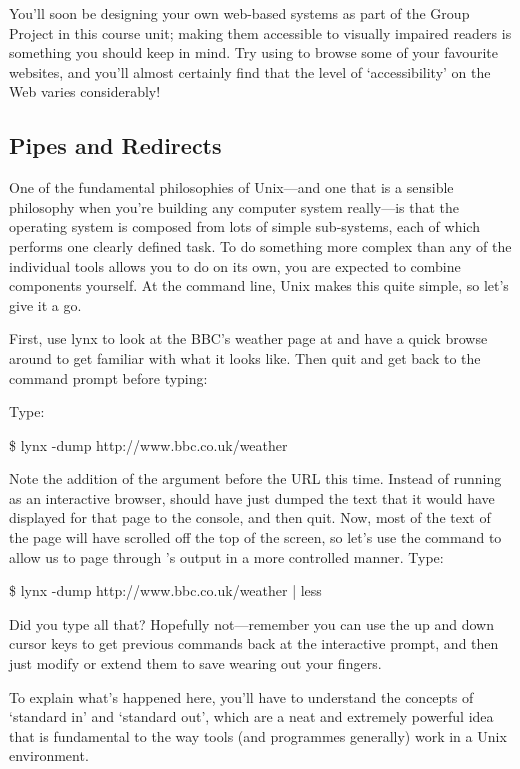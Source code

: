 You'll soon be designing your own web-based systems as part of the Group Project in this course unit; making them accessible to visually impaired readers is something you should keep in mind. Try using  to browse some of your favourite websites, and you'll almost certainly find that the level of `accessibility' on the Web varies considerably!

\subsection{Pipes and Redirects}

One of the fundamental philosophies of Unix---and one that is a sensible philosophy when you're building any computer system really---is that the operating system is composed from lots of simple sub-systems, each of which performs one clearly defined task. To do something more complex than any of the individual tools allows you to do on its own, you are expected to combine components yourself. At the command line, Unix makes this quite simple, so let's give it a go. 

First, use lynx to look at the BBC's weather page at  and have a quick browse around to get familiar with what it looks like. Then quit  and get back to the command prompt before typing:

Type:
\begin{ttoutenv}
\$ lynx -dump http://www.bbc.co.uk/weather
\end{ttoutenv}

Note the addition of the  argument before the URL this time. Instead of running as an interactive browser,  should have just dumped the text that it would have displayed for that page to the console, and then quit. Now, most of the text of the page will have scrolled off the top of the screen, so let's use the  command to allow us to page through 's output in a more controlled manner. Type:

\begin{ttoutenv}
\$ lynx -dump http://www.bbc.co.uk/weather | less
\end{ttoutenv}

Did you type all that? Hopefully not---remember you can use the up and down cursor keys to get previous commands back at the interactive prompt, and then just modify or extend them to save wearing out your fingers.

To explain what's happened here, you'll have to understand the concepts of `standard in' and `standard out', which are a neat and extremely powerful idea that is fundamental to the way tools (and programmes generally) work in a Unix environment. 

